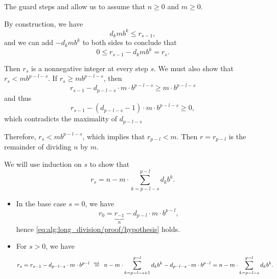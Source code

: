 \begin{defproof}
  The guard steps  and  allow us to assume that \( n \geq 0 \) and \( m \geq 0 \).

   By construction, we have
  \begin{equation*}
    d_k m b^k \leq r_{s - 1},
  \end{equation*}
  and we can add \( -d_k m b^k \) to both sides to conclude that
  \begin{equation*}
    0 \leq r_{s - 1} - d_k m b^k = r_s.
  \end{equation*}

  Then \( r_s \) is a nonnegative integer at every step \( s \). We must also show that \( r_s < m b^{p - l - s} \). If \( r_s \geq m b^{p - l - s} \), then
  \begin{equation*}
    r_{s-1} - d_{p - l - s} \cdot m \cdot b^{p - l - s} \geq m \cdot b^{p - l - s}
  \end{equation*}
  and thus
  \begin{equation*}
    r_{s-1} - (d_{p - l - s} - 1) \cdot m \cdot b^{p - l - s} \geq 0,
  \end{equation*}
  which contradicts the maximality of \( d_{p - l - s} \)

  Therefore, \( r_s < m b^{p - l - s} \), which implies that \( r_{p - l} < m \). Then \( r = r_{p - l} \) is the remainder of dividing \( n \) by \( m \).

  We will use induction on \( s \) to show that
  \begin{equation}\label{eq:alg:long_division/proof/hypothesis}
    r_s = n - m \cdot \sum_{k=p-l-s}^{p-l} d_k b^k.
  \end{equation}

  \begin{itemize}
    \item In the base case \( s = 0 \), we have
    \begin{equation*}
      r_0 = \underbrace{r_{-1}}_n - d_{p-l} \cdot m \cdot b^{p-l},
    \end{equation*}
    hence \eqref{eq:alg:long_division/proof/hypothesis} holds.

    \item For \( s > 0 \), we have
    \begin{equation*}
      r_s
      =
      r_{s-1} - d_{p-l-s} \cdot m \cdot b^{p-l}
      \reloset{\T{ind.}} =
      n - m \cdot \sum_{k=p-l-s+1}^{p-l} d_k b^k - d_{p-l-s} \cdot m \cdot b^{p-l}
      =
      n - m \cdot \sum_{k=p-l-s}^{p-l} d_k b^k.
    \end{equation*}
  \end{itemize}


\end{defproof}
